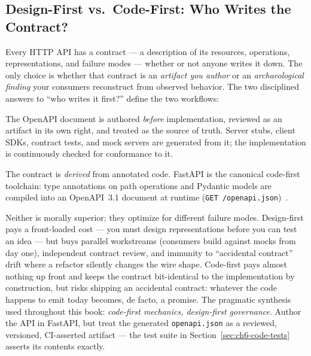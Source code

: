 \subsection{Design-First vs.\ Code-First: Who Writes the Contract?}
\label{sec:ch6-design-first}

Every HTTP API has a contract --- a description of its resources, operations,
representations, and failure modes --- whether or not anyone writes it down.
The only choice is whether that contract is an \emph{artifact you author} or
an \emph{archaeological finding} your consumers reconstruct from observed
behavior. The two disciplined answers to ``who writes it first?'' define the
two workflows:

\begin{definition}
The OpenAPI document is authored \emph{before} implementation, reviewed as an
artifact in its own right, and treated as the source of truth. Server stubs,
client SDKs, contract tests, and mock servers are generated from it; the
implementation is continuously checked for conformance to it.
\end{definition}

\begin{definition}
The contract is \emph{derived} from annotated code. FastAPI is the canonical
code-first toolchain: type annotations on path operations and Pydantic models
are compiled into an OpenAPI~3.1 document at runtime
(\texttt{GET /openapi.json})~\cite{fastapidocs}.
\end{definition}

Neither is morally superior; they optimize for different failure modes.
Design-first pays a front-loaded cost --- you must design representations
before you can test an idea --- but buys parallel workstreams (consumers build
against mocks from day one), independent contract review, and immunity to
``accidental contract'' drift where a refactor silently changes the wire
shape. Code-first pays almost nothing up front and keeps the contract
bit-identical to the implementation by construction, but risks shipping an
accidental contract: whatever the code happens to emit today becomes, de
facto, a promise. The pragmatic synthesis used throughout this book:
\emph{code-first mechanics, design-first governance}. Author the API in
FastAPI, but treat the generated \texttt{openapi.json} as a reviewed,
versioned, CI-asserted artifact --- the test suite in
Section~\ref{sec:ch6-code-tests} asserts its contents exactly.

